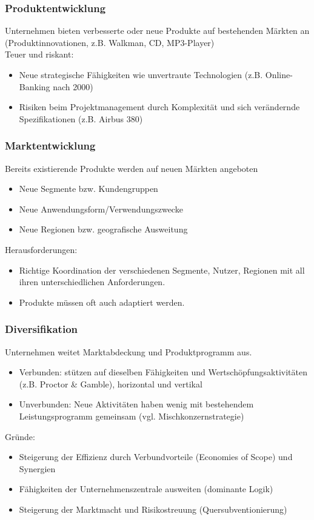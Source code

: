\subsubsection{Produktentwicklung}
Unternehmen bieten verbesserte oder neue Produkte auf bestehenden Märkten an (Produktinnovationen, z.B. Walkman, CD, MP3-Player) \\
Teuer und riskant:
\begin{itemize}
	\item Neue strategische Fähigkeiten wie unvertraute Technologien (z.B. Online-Banking nach 2000)
	\item Risiken beim Projektmanagement durch Komplexität und sich verändernde Spezifikationen (z.B. Airbus 380)
\end{itemize}

\subsubsection{Marktentwicklung}
Bereits existierende Produkte werden auf neuen Märkten angeboten
\begin{itemize}
	\item Neue Segmente bzw. Kundengruppen
	\item Neue Anwendungsform/Verwendungszwecke
	\item Neue Regionen bzw. geografische Ausweitung
\end{itemize}
Herausforderungen:
\begin{itemize}
	\item Richtige Koordination der verschiedenen Segmente, Nutzer, Regionen mit all ihren unterschiedlichen Anforderungen.
	\item Produkte müssen oft auch adaptiert werden.
\end{itemize}

\subsubsection{Diversifikation}
Unternehmen weitet Marktabdeckung und Produktprogramm aus.
\begin{itemize}
	\item Verbunden: stützen auf dieselben Fähigkeiten und Wertschöpfungsaktivitäten (z.B. Proctor \& Gamble), horizontal und vertikal
	\item Unverbunden: Neue Aktivitäten haben wenig mit bestehendem Leistungsprogramm gemeinsam (vgl. Mischkonzernstrategie)
\end{itemize}
Gründe:
\begin{itemize}
	\item Steigerung der Effizienz durch Verbundvorteile (Economies of Scope) und Synergien
	\item Fähigkeiten der Unternehmenszentrale ausweiten (dominante Logik)
	\item Steigerung der Marktmacht und Risikostreuung (Quersubventionierung)
\end{itemize}